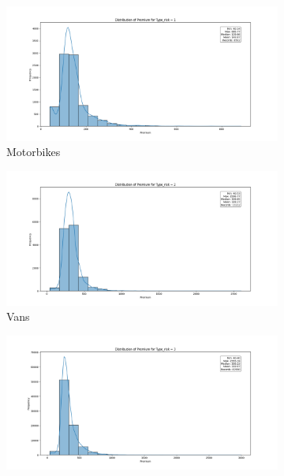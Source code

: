 \documentclass{llncs}
\begin{document}
\begin{figure}[h!]
    \centering
     \begin{subfigure}{0.45\linewidth}
      \includegraphics[width=\linewidth]{images/premium_risk1.png}
      \caption{Motorbikes}
      \label{fig:subfig1}
     \end{subfigure}
     \begin{subfigure}{0.45\linewidth}
      \includegraphics[width=\linewidth]{images/premium_risk2.png}
      \caption{Vans}
      \label{fig:subfig2}
      \end{subfigure}
  \vfill
       \begin{subfigure}{0.45\linewidth}
       \includegraphics[width=\linewidth]{images/premium_risk3.png}

\end{subfigure}
\end{figure}
\end{document}
